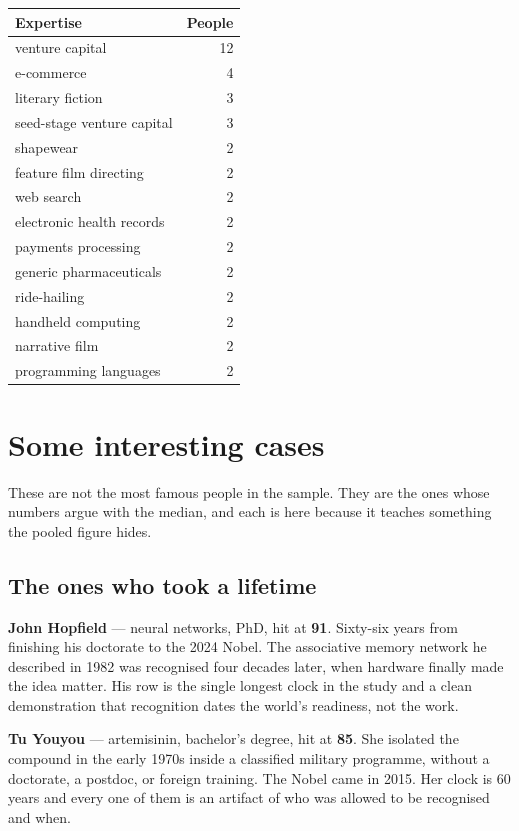 \documentclass[11pt]{article}
\begin{document}
\begin{center}\begin{tabular}{lr}\toprule Expertise & People \\\midrule
venture capital & 12 \\
e-commerce & 4 \\
literary fiction & 3 \\
seed-stage venture capital & 3 \\
shapewear & 2 \\
feature film directing & 2 \\
web search & 2 \\
electronic health records & 2 \\
payments processing & 2 \\
generic pharmaceuticals & 2 \\
ride-hailing & 2 \\
handheld computing & 2 \\
narrative film & 2 \\
programming languages & 2 \\
\bottomrule\end{tabular}\end{center}
\section{Some interesting cases}

These are not the most famous people in the sample. They are the ones whose
numbers argue with the median, and each is here because it teaches something the
pooled figure hides.

\subsection*{The ones who took a lifetime}

\textbf{John Hopfield} --- neural networks, PhD, hit at \textbf{91}. Sixty-six
years from finishing his doctorate to the 2024 Nobel. The associative memory
network he described in 1982 was recognised four decades later, when hardware
finally made the idea matter. His row is the single longest clock in the study
and a clean demonstration that recognition dates the world's readiness, not the
work.

\textbf{Tu Youyou} --- artemisinin, bachelor's degree, hit at \textbf{85}. She
isolated the compound in the early 1970s inside a classified military
programme, without a doctorate, a postdoc, or foreign training. The Nobel came in
2015. Her clock is 60 years and every one of them is an artifact of who was
allowed to be recognised and when.
\end{document}
